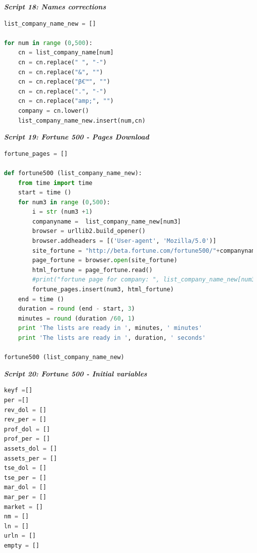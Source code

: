 \documentclass{article}
\begin{document}
\begin{center}
\textit{\textbf{Script 18: Names corrections}}\label{p18}
\end{center}
\begin{lstlisting}[language=Python]
list_company_name_new = []

for num in range (0,500):
    cn = list_company_name[num]
    cn = cn.replace(" ", "-")
    cn = cn.replace("&", "")
    cn = cn.replace("β€™", "")
    cn = cn.replace(".", "-")
    cn = cn.replace("amp;", "")    
    company = cn.lower()
    list_company_name_new.insert(num,cn)
\end{lstlisting}     

\begin{center}
\textit{\textbf{Script 19: Fortune 500 - Pages Download}}\label{p19}
\end{center}
\begin{lstlisting}[language=Python] 
fortune_pages = []

def fortune500 (list_company_name_new):
    from time import time  
    start = time ()
    for num3 in range (0,500):
        i = str (num3 +1)    
        companyname =  list_company_name_new[num3]
        browser = urllib2.build_opener() 
        browser.addheaders = [('User-agent', 'Mozilla/5.0')]
        site_fortune = "http://beta.fortune.com/fortune500/"+companyname+"-"+ i    
        page_fortune = browser.open(site_fortune)
        html_fortune = page_fortune.read()    
        #print("fortune page for company: ", list_company_name_new[num3],i)
        fortune_pages.insert(num3, html_fortune)
    end = time ()
    duration = round (end - start, 3)
    minutes = round (duration /60, 1)
    print 'The lists are ready in ', minutes, ' minutes'
    print 'The lists are ready in ', duration, ' seconds'

fortune500 (list_company_name_new)
\end{lstlisting}    

\begin{center}
\textit{\textbf{Script 20: Fortune 500 - Initial variables}}\label{p20}
\end{center}
\begin{lstlisting}[language=Python] 
keyf =[]
per =[]
rev_dol = []
rev_per = []
prof_dol = []
prof_per = []
assets_dol = []
assets_per = []
tse_dol = []
tse_per = []
mar_dol = []
mar_per = []
market = []
nm = []
ln = []
urln = []
empty = []
\end{lstlisting}  
\end{document}
